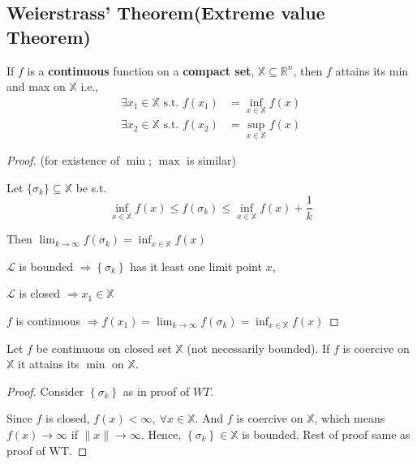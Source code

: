 \documentclass[11pt]{elegantbook}
\begin{document}
\subsection{Weierstrass' Theorem(Extreme value Theorem)}
\begin{theorem}
    \quad

    If $f$ is a \textbf{continuous} function on a \textbf{compact set}, $\mathbb{X} \subseteq \mathbb{R}^{n}$, then $f$ attains its min and max on $\mathbb{X}$ i.e.,
    $$
    \begin{aligned}
    \exists x_1 \in \mathbb{X} \text { s.t. } f\left(x_{1}\right) &=\inf _{x \in \mathbb{X}} f(x) \\
    \exists x_{2} \in \mathbb{X} \text { s.t. } f\left(x_{2}\right) &=\sup _{x \in \mathbb{X}} f(x)
    \end{aligned}
    $$
\end{theorem}
\begin{proof}
    (for existence of $\min$; $\max$ is similar)

    Let $\{\sigma_k\}\subseteq \mathbb{X}$ be s.t.
    $$\inf_{x\in\mathbb{X}} f(x) \leq f\left(\sigma_{k}\right) \leq \inf _{x \in \mathbb{X}} f(x)+\frac{1}{k}$$

    Then $\lim _{k \rightarrow \infty} f\left(\sigma_{k}\right)=\inf_{x\in\mathbb{X}} f(x)$

    $\mathcal{L}$ is bounded $\Rightarrow\left\{\sigma_{k}\right\}$ has it least one limit point $x$,

    $\mathcal{L}$ is closed $\Rightarrow x_{1} \in \mathbb{X}$

    $f$ is continuous $\Rightarrow f\left(x_{1}\right)=\lim _{k \rightarrow \infty} f\left(\sigma_{k}\right)=\inf _{x \in \mathbb{X}} f(x)$
\end{proof}

\begin{corollary}[Corollary to WT]
    Let $f$ be continuous on closed set $\mathbb{X}$ (not necessarily bounded). If $f$ is coercive on $\mathbb{X}$ it attains its $\min$ on $\mathbb{X}$.
\end{corollary}
\begin{proof}
    Consider $\left\{\sigma_{k}\right\}$ as in proof of $WT$.

    Since $f$ is closed, $f(x)<\infty,\ \forall x\in\mathbb{X}$. And $f$ is coercive on $\mathbb{X}$, which means $f(x)\rightarrow \infty$ if $\|x\| \rightarrow\infty$. Hence, $\left\{\sigma_{k}\right\}\in\mathbb{X}$ is bounded. Rest of proof same as proof of $\mathrm{WT}$.
\end{proof}
\end{document}
